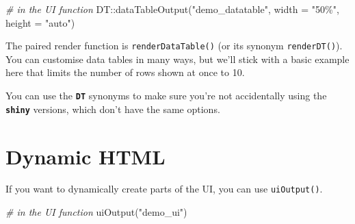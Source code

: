 \documentclass[
  oneside]{book}
\newenvironment{Shaded}{\begin{snugshade}}{\end{snugshade}}
\newcommand{\AttributeTok}[1]{\textcolor[rgb]{0.77,0.63,0.00}{#1}}
\newcommand{\CommentTok}[1]{\textcolor[rgb]{0.56,0.35,0.01}{\textit{#1}}}
\newcommand{\DecValTok}[1]{\textcolor[rgb]{0.00,0.00,0.81}{#1}}
\newcommand{\FunctionTok}[1]{\textcolor[rgb]{0.00,0.00,0.00}{#1}}
\newcommand{\NormalTok}[1]{#1}
\newcommand{\OtherTok}[1]{\textcolor[rgb]{0.56,0.35,0.01}{#1}}
\newcommand{\SpecialCharTok}[1]{\textcolor[rgb]{0.00,0.00,0.00}{#1}}
\newcommand{\StringTok}[1]{\textcolor[rgb]{0.31,0.60,0.02}{#1}}
\begin{document}
\begin{Shaded}
\begin{Highlighting}[]
\CommentTok{\# in the UI function}
\NormalTok{DT}\SpecialCharTok{::}\FunctionTok{dataTableOutput}\NormalTok{(}\StringTok{"demo\_datatable"}\NormalTok{,}
                    \AttributeTok{width =} \StringTok{"50\%"}\NormalTok{,}
                    \AttributeTok{height =} \StringTok{"auto"}\NormalTok{)}
\end{Highlighting}
\end{Shaded}

The paired render function is \texttt{renderDataTable}\texttt{()} (or its synonym \texttt{renderDT}\texttt{()}). You can customise data tables in many ways, but we'll stick with a basic example here that limits the number of rows shown at once to \DecValTok{10}.

\begin{Shaded}
\end{Shaded}

\begin{info}
You can use the \textbf{\texttt{DT}} synonyms to make sure you're not accidentally using the \textbf{\texttt{shiny}} versions, which don't have the same options.

\end{info}

\hypertarget{dynamic-html}{%
\section{Dynamic HTML}\label{dynamic-html}}

If you want to dynamically create parts of the UI, you can use \texttt{uiOutput}\texttt{()}.

\begin{Shaded}
\begin{Highlighting}[]
\CommentTok{\# in the UI function}
\FunctionTok{uiOutput}\NormalTok{(}\StringTok{"demo\_ui"}\NormalTok{)}
\end{Highlighting}
\end{Shaded}
\end{document}
